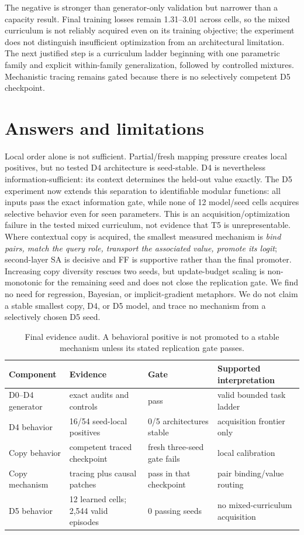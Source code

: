 \documentclass[10pt]{article}
\begin{document}
The negative is stronger than generator-only validation but narrower than a capacity result. Final training losses remain 1.31--3.01 across cells, so the mixed curriculum is not reliably acquired even on its training objective; the experiment does not distinguish insufficient optimization from an architectural limitation. The next justified step is a curriculum ladder beginning with one parametric family and explicit within-family generalization, followed by controlled mixtures. Mechanistic tracing remains gated because there is no selectively competent D5 checkpoint.

\section{Answers and limitations}
Local order alone is not sufficient. Partial/fresh mapping pressure creates local positives, but no tested D4 architecture is seed-stable. D4 is nevertheless information-sufficient: its context determines the held-out value exactly. The D5 experiment now extends this separation to identifiable modular functions: all inputs pass the exact information gate, while none of 12 model/seed cells acquires selective behavior even for seen parameters. This is an acquisition/optimization failure in the tested mixed curriculum, not evidence that T5 is unrepresentable. Where contextual copy is acquired, the smallest measured mechanism is \emph{bind pairs, match the query role, transport the associated value, promote its logit}; second-layer SA is decisive and FF is supportive rather than the final promoter. Increasing copy diversity rescues two seeds, but update-budget scaling is non-monotonic for the remaining seed and does not close the replication gate. We find no need for regression, Bayesian, or implicit-gradient metaphors. We do not claim a stable smallest copy, D4, or D5 model, and trace no mechanism from a selectively chosen D5 seed.

\begin{table}[H]\centering\small
\caption{Final evidence audit. A behavioral positive is not promoted to a stable mechanism unless its stated replication gate passes.}\label{tab:evidence-audit}
\begin{tabular}{llll}\toprule
Component & Evidence & Gate & Supported interpretation\\\midrule
D0--D4 generator & exact audits and controls & pass & valid bounded task ladder\\
D4 behavior & 16/54 seed-local positives & 0/5 architectures stable & acquisition frontier only\\
Copy behavior & competent traced checkpoint & fresh three-seed gate fails & local calibration\\
Copy mechanism & tracing plus causal patches & pass in that checkpoint & pair binding/value routing\\
D5 behavior & 12 learned cells; 2,544 valid episodes & 0 passing seeds & no mixed-curriculum acquisition\\
\bottomrule\end{tabular}
\end{table}
\end{document}
